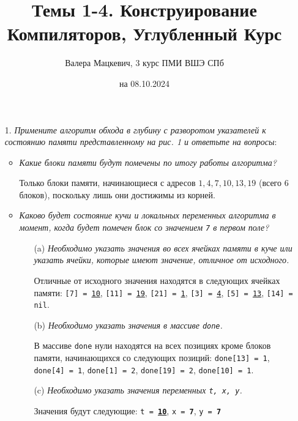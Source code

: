 \documentclass{article}
\title{Темы 1-4. Конструирование Компиляторов, Углубленный Курс}
\author{Валера Мацкевич, 3 курс ПМИ ВШЭ СПб}
\date{на 08.10.2024}
\begin{document}
\maketitle

\begin{enumerate}
    \begin{figure}[h]
    \centering
    \texttt{[image: heap.png]}
    \caption{Куча}
    \label{fig:name} 
\end{figure}
    \item[1.] \textit{Примените алгоритм обхода в глубину с разворотом указателей к состоянию памяти представленному на рис. 1 и ответьте на вопросы}:\begin{itemize}
        \item \textit{Какие блоки памяти будут помечены по итогу работы алгоритма?}
        
        Только блоки памяти, начинающиеся с адресов $1, 4, 7, 10, 13, 19$ (всего $6$ блоков), поскольку лишь они достижимы из корней.

        \item \textit{Каково будет состояние кучи и локальных переменных алгоритма в момент, когда будет помечен блок со значением \texttt{\color{blue}7} в первом поле?}
        \begin{itemize}
            \item[(a)] \textit{Необходимо указать значения во всех ячейках памяти в куче или указать ячейки, которые имеют значение, отличное от исходного.}

            Отличные от исходного значения находятся в следующих ячейках памяти: \texttt{[7] = \underline{10}}, \texttt{[11] = \underline{19}}, \texttt{[21] = \underline{1}}, \texttt{[3] = \underline{4}}, \texttt{[5] = \underline{13}}, \texttt{[14] = nil}.
            
            \item[(b)] \textit{Необходимо указать значения в массиве \texttt{done}.}

            В массиве \texttt{done} нули находятся на всех позициях кроме блоков памяти, начинающихся со следующих позиций: \texttt{done[13] = 1}, \texttt{done[4] = 1}, \texttt{done[1] = 2}, \texttt{done[19] = 2}, \texttt{done[10] = 1}.
            
            \item[(c)] \textit{Необходимо указать значения переменных \texttt{t, x, y}.}
        
            Значения будут следующие: \texttt{t = \textbf{\underline{10}}}, \texttt{x = \textbf{\color{blue} 7}}, \texttt{y = \textbf{\color{blue} 7}}
        \end{itemize}


\end{itemize}
\end{enumerate}
\end{document}
